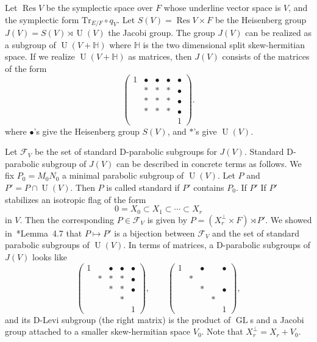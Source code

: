 \documentclass[letterpaper,11pt]{amsart}
\newcommand{\bH}{\mathbb{H}}
\newcommand{\cF}{\mathcal{F}}
\newcommand{\<}{\negthickspace}
\DeclareMathOperator{\GL}{GL}
\DeclareMathOperator{\U}{U}
\DeclareMathOperator{\Res}{Res}
\theoremstyle{definition}
\theoremstyle{plain}
\theoremstyle{remark}
\numberwithin{equation}{section}
\begin{document}
Let $\Res V$ be the symplectic space over $F$ whose underline vector space is
$V$, and the symplectic form $\mathrm{Tr}_{E/F} \circ q_V$.
Let $S(V) = \Res V \times F$ be the Heisenberg group $J(V) = S(V) \rtimes \U(V)$ the Jacobi group. The group $J(V)$ can be realized as a subgroup of $\U(V + \bH)$ where $\bH$ is the two dimensional split skew-hermitian space. If we realize $\U(V+ \bH)$ as matrices, then $J(V)$ consists of the matrices of the form
    \[
    \begin{pmatrix} 1 &\bullet &\bullet &\bullet &\bullet \\
    &*&*&*&\bullet\\ &*&*&*&\bullet \\
    &*&*&*&\bullet \\ &&&& 1\end{pmatrix}.
    \]
where $\bullet$'s give the Heisenberg group $S(V)$, and $*$'s give $\U(V)$.

Let $\cF_V$ be the set of standard D-parabolic subgroups for $J(V)$. Standard D-parabolic subgroup of $J(V)$ can be described in concrete terms as follows. We fix $P_0 = M_0 N_0$ a minimal parabolic subgroup of $\U(V)$. Let $P$ and $P' = P \cap \U(V)$. Then $P$ is called standard if $P'$ contains $P_0$. If $P'$  If $P'$ stabilizes an isotropic flag of the form 
\begin{equation} \label{eq:isotropic flag}
0=X_0 \subset X_1 \subset \cdots \subset X_r
    \end{equation}
in $V$. Then the corresponding $P \in \cF_V$ is
given by $P = (X_r^\perp \times F) \rtimes P'$. We showed in~\cite{BLX1}*{Lemma~4.7} that $P \mapsto P'$ is a bijection between $\cF_V$ and the set of standard parabolic subgroups of $\U(V)$. In terms of matrices, a D-parabolic subgroups of $J(V)$ looks like
    \[
    \begin{pmatrix} 1 & &\bullet &\bullet &\bullet \\
    &*&*&*&\bullet\\ &&*&*&\bullet \\
    &&&* \\ &&&& 1\end{pmatrix}, \qquad
    \begin{pmatrix} 1 & &\bullet & &\bullet \\
    &*&&&\\ &&*&&\bullet \\
    &&&* \\ &&&& 1\end{pmatrix},
    \]
and its D-Levi subgroup (the right matrix) is the product of $\GL$s and a Jacobi group attached to a smaller skew-hermitian space $V_0$. Note that $X_r^{\perp} = X_r + V_0$.
\end{document}
